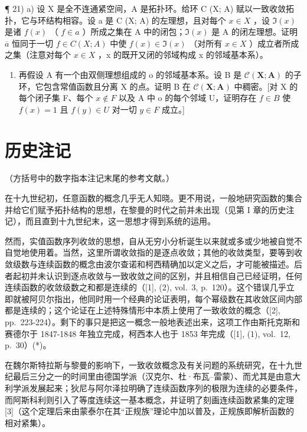 ¶ 21) a) 设 X 是全不连通紧空间，A 是拓扑环。给环 C (X; A) 赋以一致收敛拓扑，它与环结构相容。设 a 是 C (X; A) 的左理想，且对每个 \(x \in X\) ，设 \(\Im(x)\) 是诸 \(f(x)\) （ \(f \in a\) ）所成之集在 A 中的闭包；\(\Im(x)\) 是 A 的闭左理想。证明 \(\overline{a}\) 恒同于一切 \(f \in C(X; A)\) 中使 \(f(x) \in \Im(x)\) （对所有 \(x \in X\) ）成立者所成之集（注意对每个 \(x \in X\) ，x 的既开又闭的邻域构成 x 的邻域基本系）。

\begin{enumerate}
\def\labelenumi{\alph{enumi})}
\setcounter{enumi}{1}
\tightlist
\item
  再假设 A 有一个由双侧理想组成的 o 的邻域基本系。设 B 是 \(\mathcal{C}(\mathbf{X};\mathbf{A})\) 的子环，它包含常值函数且分离 X 的点。证明 B 在 \(\mathcal{C}(\mathbf{X};\mathbf{A})\) 中稠密。{[}对 X 的每个闭子集 F、每个 \(x\notin F\) 以及 A 中 o 的每个邻域 U，证明存在 \(f\in B\) 使 \(f(x)=1\) 且 \(f(y)\in U\) 对一切 \(y\in F\) 成立。{]}
\end{enumerate}

\section*{历史注记}
{}

（方括号中的数字指本注记末尾的参考文献。）

在十九世纪初，任意函数的概念几乎无人知晓。更不用说，一般地研究函数的集合并给它们赋予拓扑结构的思想，在黎曼的时代之前并未出现（见第 I 章的历史注记），而且直到十九世纪末，这一思想才得到系统的运用。

然而，实值函数序列收敛的思想，自从无穷小分析诞生以来就或多或少地被自觉不自觉地使用着。当然，这里所谓收敛指的是逐点收敛；其他的收敛类型，要等到收敛级数与连续函数的概念由波尔查诺和柯西精确加以定义之后，才可能被描述。后者起初并未认识到逐点收敛与一致收敛之间的区别，并且相信自己已经证明，任何连续函数的收敛级数之和都是连续的（{[}1{]}, (2), vol.~3, p.~120）。这个错误几乎立即就被阿贝尔指出，他同时用一个经典的论证表明，每个幂级数在其收敛区间内部都是连续的；这个论证在上述特殊情形中本质上使用了一致收敛的概念（{[}2{]}, pp.~223-224）。剩下的事只是把这一概念一般地表述出来，这项工作由斯托克斯和赛德尔于 1847-1848 年独立完成，柯西本人也于 1853 年完成（{[}1{]}, (1), vol.~12, p.~30）(*)。

在魏尔斯特拉斯与黎曼的影响下，一致收敛概念及有关问题的系统研究，在十九世纪最后三分之一的时间里由德国学派（汉克尔、杜·布瓦–雷蒙）、而尤其是由意大利学派发展起来；狄尼与阿尔泽拉明确了连续函数序列的极限为连续的必要条件，而阿斯科利则引入了等度连续这一基本概念，并证明了刻画连续函数紧集的定理{[}3{]}（这个定理后来由蒙泰尔在其“正规族”理论中加以普及，正规族即解析函数的相对紧集）。

